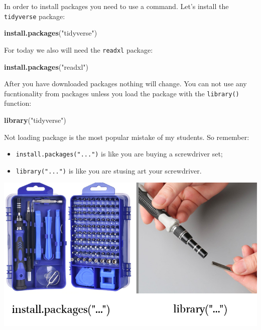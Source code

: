 \documentclass[
]{book}
\newenvironment{Shaded}{\begin{snugshade}}{\end{snugshade}}
\newcommand{\KeywordTok}[1]{\textcolor[rgb]{0.13,0.29,0.53}{\textbf{#1}}}
\newcommand{\NormalTok}[1]{#1}
\newcommand{\StringTok}[1]{\textcolor[rgb]{0.31,0.60,0.02}{#1}}
\providecommand{\tightlist}{%
  \setlength{\itemsep}{0pt}\setlength{\parskip}{0pt}}
\begin{document}
In order to install packages you need to use a command. Let's install the \texttt{tidyverse} package:

\begin{Shaded}
\begin{Highlighting}[]
\KeywordTok{install.packages}\NormalTok{(}\StringTok{"tidyverse"}\NormalTok{)}
\end{Highlighting}
\end{Shaded}

For today we also will need the \texttt{readxl} package:

\begin{Shaded}
\begin{Highlighting}[]
\KeywordTok{install.packages}\NormalTok{(}\StringTok{"readxl"}\NormalTok{)}
\end{Highlighting}
\end{Shaded}

After you have downloaded packages nothing will change. You can not use any fucntionality from packages unless you load the package with the \texttt{library()} function:

\begin{Shaded}
\begin{Highlighting}[]
\KeywordTok{library}\NormalTok{(}\StringTok{"tidyverse"}\NormalTok{)}
\end{Highlighting}
\end{Shaded}

Not loading package is the most popular mistake of my students. So remember:

\begin{itemize}
\tightlist
\item
  \texttt{install.packages("...")} is like you are buying a screwdriver set;
\item
  \texttt{library("...")} is like you are stusing art your screwdriver.
\end{itemize}

\includegraphics{images/01.05.install-packages-vs-library.png}
\end{document}
